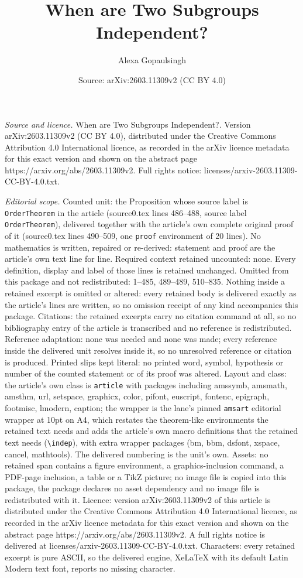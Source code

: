 \documentclass[10pt,a4paper]{amsart}
\title[When are Two Subgroups Independent?]{When are Two Subgroups Independent?}
\author{Alexa Gopaulsingh}
\date{Source: arXiv:2603.11309v2 (CC BY 4.0)}
\begin{document}
\maketitle

\noindent\emph{Source and licence.} When are Two Subgroups Independent?. Version arXiv:2603.11309v2 (CC BY 4.0), distributed under the Creative Commons Attribution 4.0 International licence, as recorded in the arXiv licence metadata for this exact version and shown on the abstract page https://arxiv.org/abs/2603.11309v2. Full rights notice: licenses/arxiv-2603.11309-CC-BY-4.0.txt.\par\smallskip

\noindent\textit{Editorial scope.} Counted unit: the Proposition whose source label is \texttt{OrderTheorem} in the article (source0.tex lines 486--488, source label \texttt{OrderTheorem}), delivered together with the article's own complete original proof of it (source0.tex lines 490--509, one \texttt{proof} environment of 20 lines). No mathematics is written, repaired or re-derived: statement and proof are the article's own text line for line. Required context retained uncounted: none. Every definition, display and label of those lines is retained unchanged. Omitted from this package and not redistributed: 1--485, 489--489, 510--835. Nothing inside a retained excerpt is omitted or altered: every retained body is delivered exactly as the article's lines are written, so no omission receipt of any kind accompanies this package. Citations: the retained excerpts carry no citation command at all, so no bibliography entry of the article is transcribed and no reference is redistributed. Reference adaptation: none was needed and none was made; every reference inside the delivered unit resolves inside it, so no unresolved reference or citation is produced. Printed slips kept literal: no printed word, symbol, hypothesis or number of the counted statement or of its proof was altered. Layout and class: the article's own class is \texttt{article} with packages including amssymb, amsmath, amsthm, url, setspace, graphicx, color, pifont, euscript, fontenc, epigraph, footmisc, lmodern, caption; the wrapper is the lane's pinned \texttt{amsart} editorial wrapper at 10pt on A4, which restates the theorem-like environments the retained text needs and adds the article's own macro definitions that the retained text needs (\texttt{\textbackslash indep}), with extra wrapper packages (bm, bbm, dsfont, xspace, cancel, mathtools). The delivered numbering is the unit's own. Assets: no retained span contains a figure environment, a graphics-inclusion command, a PDF-page inclusion, a table or a TikZ picture; no image file is copied into this package, the package declares no asset dependency and no image file is redistributed with it. Licence: version arXiv:2603.11309v2 of this article is distributed under the Creative Commons Attribution 4.0 International licence, as recorded in the arXiv licence metadata for this exact version and shown on the abstract page https://arxiv.org/abs/2603.11309v2. A full rights notice is delivered at licenses/arxiv-2603.11309-CC-BY-4.0.txt. Characters: every retained excerpt is pure ASCII, so the delivered engine, XeLaTeX with its default Latin Modern text font, reports no missing character.
\end{document}
